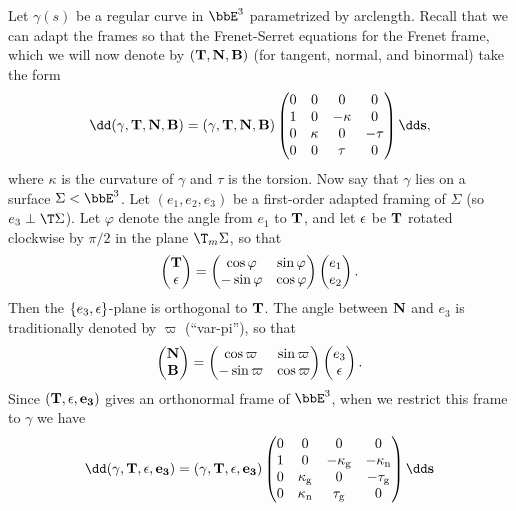 Let $\gamma(s)$ be a regular curve in $\bbE^3$ parametrized by arclength. Recall that we can adapt the frames so that the Frenet-Serret equations for the Frenet frame, which we will now denote by $(\bf{T},\bf{N},\bf{B})$ (for tangent, normal, and binormal) take the form
\[\dd(\gamma,\bf{T},\bf{N},\bf{B})=(\gamma,\bf{T},\bf{N},\bf{B})\begin{pmatrix}
    0 & 0&0&0\\
    1&0&-\kappa &0\\
    0& \kappa &0 &-\tau \\
    0 & 0& \tau & 0
\end{pmatrix}\dd s,\]
where $\kappa$ is the curvature of $\gamma$ and $\tau$ is the torsion. Now say that $\gamma$ lies on a surface $\Sigma <\bbE^3$. Let $(e_1,e_2,e_3)$ be a first-order adapted framing of $\Sigma$ (so $e_3\perp \T\Sigma$). Let $\varphi$ denote the angle from $e_1$ to $\bf{T}$, and let $\bf{\epsilon}$ be $\bf{T}$ rotated clockwise by $\pi/2$ in the plane $\T_m\Sigma$, so that 
\[\begin{pmatrix}
    \bf{T}\\\bf{\epsilon}
\end{pmatrix}=\begin{pmatrix}
    \cos\varphi & \sin\varphi\\
    -\sin\varphi & \cos\varphi
\end{pmatrix}\begin{pmatrix}
    e_1\\ e_2
\end{pmatrix}.\]
Then the $\{e_3,\bf{\epsilon}\}$-plane is orthogonal to $\bf{T}$. The angle between $\bf{N}$ and $e_3$ is traditionally denoted by $\varpi$ (``var-pi''), so that 
\[\begin{pmatrix}
    \bf{N}\\\bf{B}
\end{pmatrix}=\begin{pmatrix}
    \cos\varpi & \sin\varpi\\
    -\sin\varpi & \cos\varpi
\end{pmatrix}\begin{pmatrix}
    e_3\\ \bf{\epsilon}
\end{pmatrix}.\]
Since $(\bf{T},\bf{\epsilon},e_3)$ gives an orthonormal frame of $\bbE^3$, when we restrict this frame to $\gamma$ we have 
\[\dd (\gamma,\bf{T},\bf{\epsilon},e_3)=(\gamma,\bf{T},\bf{\epsilon},e_3)\begin{pmatrix}
    0&0&0&0\\
    1&0&-\kappa_{\mathrm{g}} &-\kappa_{\mathrm{n}}\\
    0&\kappa_{\mathrm{g}}&0&-\tau_{\mathrm{g}}\\
    0&\kappa_{\mathrm{n}}&\tau_{\mathrm{g}}&0
\end{pmatrix}\dd s\]
